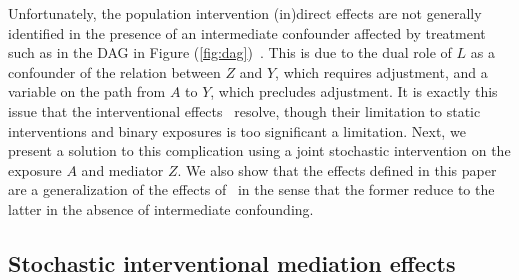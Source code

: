 Unfortunately, the population intervention (in)direct effects are not generally
identified in the presence of an intermediate confounder affected by treatment
such as in the DAG in Figure (\ref{fig:dag})~\citep{diaz2020causal}. This is due
to the dual role of $L$ as a confounder of the relation between $Z$ and $Y$,
which requires adjustment, and a variable on the path from $A$ to $Y$, which
precludes adjustment. It is exactly this issue that the interventional
effects~\citep{vanderweele2014effect} resolve, though their limitation to static
interventions and binary exposures is too significant a limitation. Next, we
present a solution to this complication using a joint stochastic intervention on
the exposure $A$ and mediator $Z$. We also show that the effects defined in this
paper are a generalization of the effects of~\cite{diaz2020causal} in the sense
that the former reduce to the latter in the absence of intermediate confounding.

\subsection{Stochastic interventional mediation effects}

